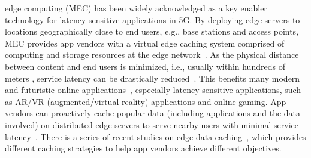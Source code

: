 \documentclass[10pt,journal,compsoc]{IEEEtran}
\begin{document}
%
\IEEEpeerreviewmaketitle



 edge computing (MEC) has been widely acknowledged as a key enabler technology for latency-sensitive applications in 5G. By deploying edge servers to locations geographically close to end users, e.g., base stations and access points, MEC provides app vendors with a virtual edge caching system comprised of computing and storage resources at the edge network~\cite{9155365}. As the physical distance between content and end users is minimized, i.e., usually within hundreds of meters \cite{zhao2022joint}, service latency can be drastically reduced~\cite{li2021cooperative}. This benefits many modern and futuristic online applications~\cite{gao2020rethinking}, especially latency-sensitive applications, such as AR/VR (augmented/virtual reality) applications and online gaming. App vendors can proactively cache popular data (including applications and the data involved) on distributed edge servers to serve nearby users with minimal service latency~\cite{xia2020online}. There is a series of recent studies on edge data caching~\cite{9155233,glasbergen2020chronocache,xia2021cost}, which provides different caching strategies to help app vendors achieve different objectives. 

\iffalse
\begin{figure}[!htb]
    \centering
    \texttt{[image: Figures/EdgeComputingConcept.pdf]}
    \caption{Example Scenario of MEC. Meta's Data are Cached on Edge Servers and Accessed by Nearby End Users. The Shorten Data Retrieval Distance Reduces Service Latency.}
    \label{fig:MEC_Concept}
\end{figure}
\fi
\end{document}
